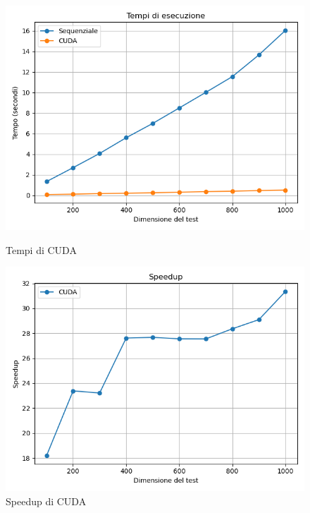 \documentclass[11pt]{article}
\begin{document}
    \begin{figure}[H]
        \centering
        \begin{minipage}{0.49\textwidth}
            \centering
            \includegraphics[width=\textwidth]{plots/1024/cuda_times}
            \caption{Tempi di CUDA}\label{fig:times-1024-cuda}
        \end{minipage}
        \begin{minipage}{0.49\textwidth}
            \centering
            \includegraphics[width=\textwidth]{plots/1024/cuda_speedup}
            \caption{Speedup di CUDA}\label{fig:speedup-1024-cuda}
        \end{minipage}
    \end{figure}
\end{document}
